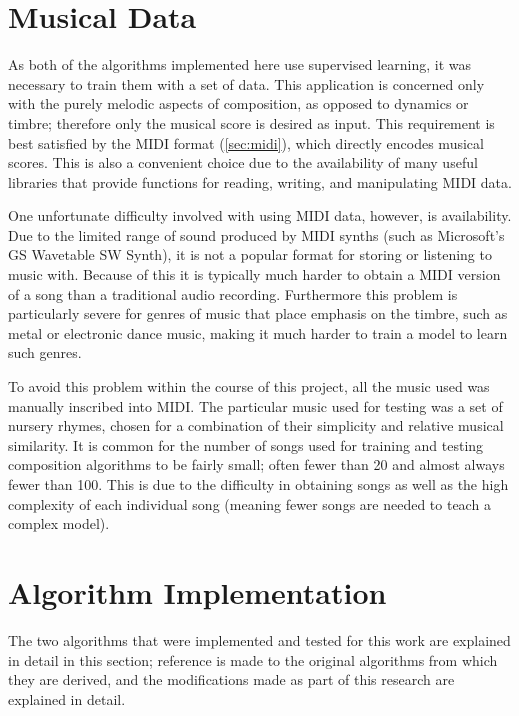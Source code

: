 \documentclass[ author={Stephen Livermore-Tozer},
				supervisor={Dr. Peter Flach},
				degree={MEng},
				title={Algorithmic Co-composition Using Machine Learning},
				subtitle={},
				type={research},
				year={2016} ]{dissertation}
\begin{document}
	\section{Musical Data}
	\label{sec:midi-data}
	
	As both of the algorithms implemented here use supervised learning, it was necessary to train them with a set of data. This application is concerned only with the purely melodic aspects of composition, as opposed to dynamics or timbre; therefore only the musical score is desired as input. This requirement is best satisfied by the MIDI format (\ref{sec:midi}), which directly encodes musical scores. This is also a convenient choice due to the availability of many useful libraries that provide functions for reading, writing, and manipulating MIDI data. 
	
	One unfortunate difficulty involved with using MIDI data, however, is availability. Due to the limited range of sound produced by MIDI synths (such as Microsoft's GS Wavetable SW Synth), it is not a popular format for storing or listening to music with. Because of this it is typically much harder to obtain a MIDI version of a song than a traditional audio recording. Furthermore this problem is particularly severe for genres of music that place emphasis on the timbre, such as metal or electronic dance music, making it much harder to train a model to learn such genres. 
	
	To avoid this problem within the course of this project, all the music used was manually inscribed into MIDI. The particular music used for testing was a set of nursery rhymes, chosen for a combination of their simplicity and relative musical similarity. It is common for the number of songs used for training and testing composition algorithms to be fairly small; often fewer than 20 and almost always fewer than 100. This is due to the difficulty in obtaining songs as well as the high complexity of each individual song (meaning fewer songs are needed to teach a complex model).
		
	\section{Algorithm Implementation}
	\label{sec:implementation}
	
	The two algorithms that were implemented and tested for this work are explained in detail in this section; reference is made to the original algorithms from which they are derived, and the modifications made as part of this research are explained in detail. 
	
\end{document}
